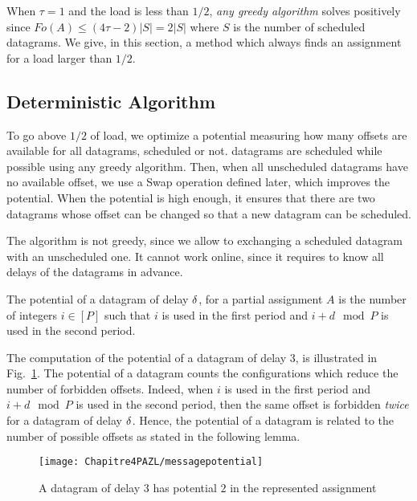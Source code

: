 When $\tau = 1$ and the load is less than $1/2$, \emph{any greedy algorithm} solves \pma positively since $Fo(A) \leq (4\tau -2)|S| = 2|S|$ where $S$ is the number of scheduled datagrams. We give, in this section, a method which always finds an assignment for a load larger than $1/2$.

\subsection{Deterministic Algorithm}

To go above $1/2$ of load, we optimize a potential measuring how many offsets are available for all datagrams, scheduled or not. datagrams are scheduled while possible using any greedy algorithm. Then, when all unscheduled datagrams have no available offset, we use a Swap operation defined later, which improves the potential. When the potential is high enough, it ensures that there are two datagrams whose offset can be changed so that a new datagram can be scheduled. 

The algorithm is not greedy, since we allow to exchanging a scheduled datagram with an unscheduled one. It cannot work online, since it requires to know all delays of the datagrams in advance. 

\begin{definition}
The potential of a datagram of delay $\delta$, for a partial assignment $A$
is the number of integers $i \in [P]$ such that $i$ is used in the first period and $i+d \mod P$ is used in the second period.
\end{definition}

The computation of the potential of a datagram of delay $3$, is illustrated in Fig.~\ref{fig:datagrampotential}.
The potential of a datagram counts the configurations which reduce the number of forbidden offsets.
Indeed, when $i$ is used in the first period and $i+d \mod P$ is used in the second period,
then the same offset is forbidden \emph{twice} for a datagram of delay $\delta$. Hence, the potential of a datagram is related to the number of possible offsets as stated in the following lemma. 
\begin{figure}
 \begin{center}
\texttt{[image: Chapitre4PAZL/messagepotential]}
\end{center}
\caption{A datagram of delay $3$ has potential $2$ in the represented assignment}
\label{fig:datagrampotential}
\end{figure} 

